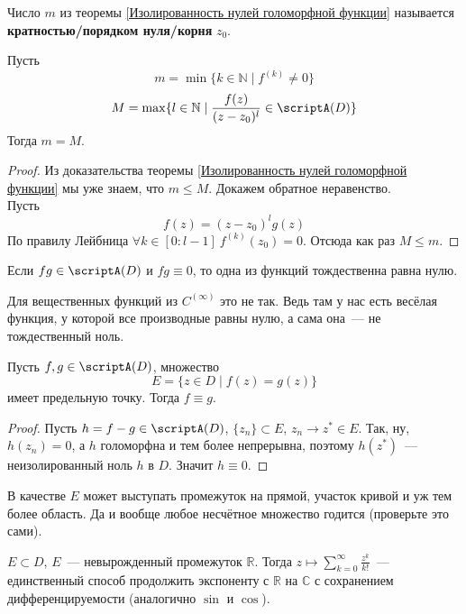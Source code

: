 \documentclass{article}
\begin{document}
    \begin{definition}
        Число $m$ из теоремы \ref{Изолированность нулей голоморфной функции} называется \textbf{кратностью/порядком нуля/корня} $z_0$.
    \end{definition}
    \begin{claim}
        Пусть
        $$
        m=\min\{k\in\mathbb N\mid f^{(k)}\neq0\}
        $$
        $$
        M=\max\{l\in\mathbb N\mid \frac{f(z)}{(z-z_0)^l}\in\scriptA(D)\}
        $$
        Тогда $m=M$.
    \end{claim}
    \begin{proof}
        Из доказательства теоремы \ref{Изолированность нулей голоморфной функции} мы уже знаем, что $m\leqslant M$. Докажем обратное неравенство.\\
        Пусть
        $$f(z)=(z-z_0)^lg(z)$$
        По правилу Лейбница $\forall k\in[0:l-1]~f^{(k)}(z_0)=0$. Отсюда как раз $M\leqslant m$.
    \end{proof}
    \begin{corollary}
        Если $fg\in\scriptA(D)$ и $fg\equiv0$, то одна из функций тождественна равна нулю.
    \end{corollary}
    \begin{remark}
        Для вещественных функций из $C^{(\infty)}$ это не так. Ведь там у нас есть весёлая функция, у которой все производные равны нулю, а сама она~--- не тождественный ноль.
    \end{remark}
    \begin{theorem}
        \label{Теорема единственности для голоморфных функций}
        Пусть $f,g\in\scriptA(D)$, множество
        $$
        E=\{z\in D\mid f(z)=g(z)\}
        $$
        имеет предельную точку. Тогда $f\equiv g$.
    \end{theorem}
    \begin{proof}
        Пусть $h=f-g\in\scriptA(D)$, $\{z_n\}\subset E$, $z_n\to z^*\in E$. Так, ну, $h(z_n)=0$, а $h$ голоморфна и тем более непрерывна, поэтому $h(z^*)$~--- неизолированный ноль $h$ в $D$. Значит $h\equiv0$.
    \end{proof}
    \begin{remark}
        В качестве $E$ может выступать промежуток на прямой, участок кривой и уж тем более область. Да и вообще любое несчётное множество годится (проверьте это сами).
    \end{remark}
    \begin{example}
        $E\subset D$, $E$~--- невырожденный промежуток $\mathbb R$. Тогда $z\mapsto\sum\limits_{k=0}^\infty\frac{z^k}{k!}$~--- единственный способ продолжить экспоненту с $\mathbb R$ на $\mathbb C$ с сохранением дифференцируемости (аналогично $\sin$ и $\cos$).
    \end{example}
\end{document}
